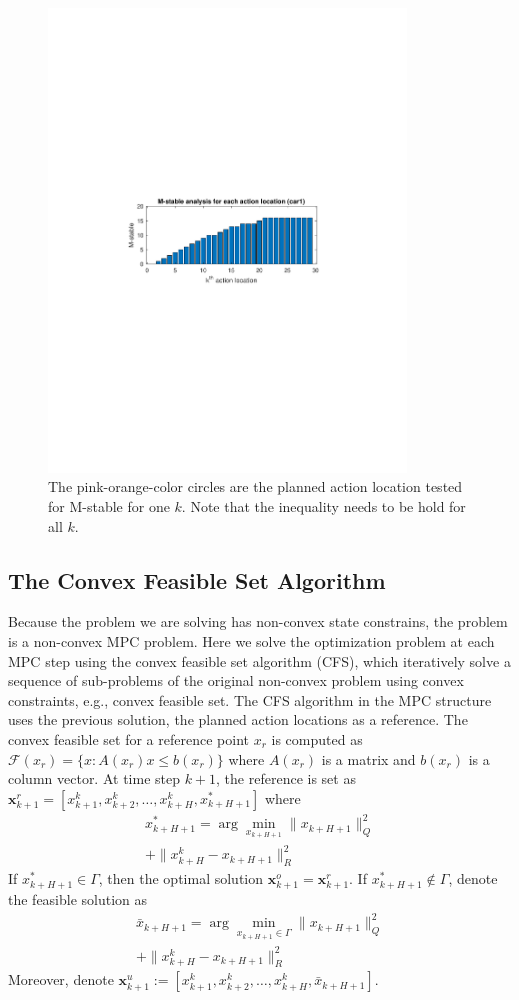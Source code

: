 \documentclass{ifacconf}
\begin{document}
\begin{figure}[htbp]
\begin{center}
\includegraphics[width=9.5cm]{untitled.pdf}
\caption{The pink-orange-color circles are the planned action location tested for M-stable for one $k$. Note that the inequality needs to be hold for all $k$.}
\label{fig: mpc}
\end{center}
\end{figure}


\subsection{The Convex Feasible Set Algorithm}
Because the problem we are solving has non-convex state constrains, the problem is a non-convex MPC problem. Here we solve the optimization problem at each MPC step using the convex feasible set algorithm (CFS), which iteratively solve a sequence of sub-problems of the original non-convex problem using convex constraints, e.g., convex feasible set. The CFS algorithm in the MPC structure uses the previous solution, the planned action locations as a reference. The convex feasible set for a reference point $x_r$ is computed as $\mathcal{F}(x_r) = \{x:A(x_r)x\leq b(x_r)\}$ where $A(x_r)$ is a matrix and $b(x_r)$ is a column vector. 
At time step $k+1$, the reference is set as $\mathbf{x}_{k+1}^{r}=[x_{k+1}^{k},x_{k+2}^{k},\ldots,x_{k+H}^k, x_{k+H+1}^*]$ where
\begin{eqnarray}
x_{k+H+1}^* = \arg\min_{x_{k+H+1}} \|x_{k+H+1}\|_Q^2\\+\|x_{k+H}^k-x_{k+H+1}\|_R^2
\end{eqnarray}
If $x_{k+H+1}^*\in\Gamma$, then the optimal solution $\mathbf{x}_{k+1}^o = \mathbf{x}_{k+1}^r$.  If $x_{k+H+1}^*\notin\Gamma$, denote the feasible solution as 
\begin{eqnarray}
\bar{x}_{k+H+1} = \arg\min_{x_{k+H+1}\in\Gamma} \|x_{k+H+1}\|_Q^2\\
+\|x_{k+H}^k-x_{k+H+1}\|_R^2
\end{eqnarray}
Moreover, denote $\mathbf{x}_{k+1}^{u}:=[x_{k+1}^{k},x_{k+2}^{k},\ldots,x_{k+H}^k, \bar x_{k+H+1}]$. 
\end{document}
